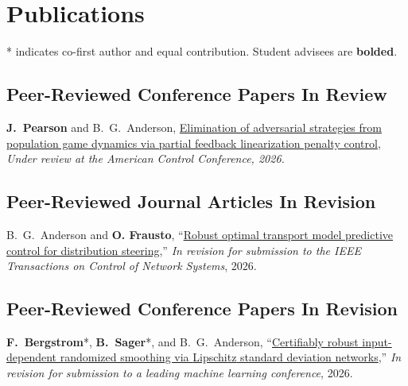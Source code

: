 \section{Publications}
* indicates co-first author and equal contribution. Student advisees are \textbf{bolded}. \\

\vspace*{\subsectionskip}

\subsection{Peer-Reviewed Conference Papers In Review}
\begin{enumerate}[label={[\arabic*]}]
	\item \textbf{J.\ Pearson} and B.\ G.\ Anderson, \href{https://brendon-anderson.github.io/files/publications/pearson2026elimination-long.pdf}{Elimination of adversarial strategies from population game dynamics via partial feedback linearization penalty control}, \textit{Under review at the American Control Conference, 2026.}
\end{enumerate}

\subsection{Peer-Reviewed Journal Articles In Revision}
\begin{enumerate}[label={[\arabic*]}]
	\item B.\ G.\ Anderson and \textbf{O. Frausto}, ``\href{https://brendon-anderson.github.io/files/publications/anderson2025robust.pdf}{Robust optimal transport model predictive control for distribution steering},'' \textit{In revision for submission to the IEEE Transactions on Control of Network Systems}, 2026.
\end{enumerate}

\vspace*{\baselineskip}

\subsection{Peer-Reviewed Conference Papers In Revision}
\begin{enumerate}[label={[\arabic*]}]
	\item \textbf{F.\ Bergstrom}*, \textbf{B.\ Sager}*, and B.\ G.\ Anderson, ``\href{https://brendon-anderson.github.io/files/publications/bergstrom2025certifiably-draft.pdf}{Certifiably robust input-dependent randomized smoothing via {Lipschitz} standard deviation networks},'' \textit{In revision for submission to a leading machine learning conference}, 2026.
\end{enumerate}

